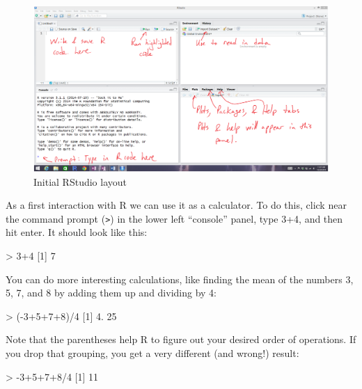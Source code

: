 \documentclass[]{book}
\newenvironment{Shaded}{\begin{snugshade}}{\end{snugshade}}
\newcommand{\DecValTok}[1]{\textcolor[rgb]{0.00,0.00,0.81}{{#1}}}
\newcommand{\StringTok}[1]{\textcolor[rgb]{0.31,0.60,0.02}{{#1}}}
\newcommand{\NormalTok}[1]{{#1}}
\begin{document}
\begin{figure}
\includegraphics[width=14.72in]{chapter0_files/image003} \caption{Initial RStudio layout}\label{fig:Figure2}
\end{figure}

As a first interaction with R we can use it as a calculator. To do this,
click near the command prompt (\texttt{\textgreater{}}) in the lower
left ``console'' panel, type 3+4, and then hit enter. It should look
like this:

\begin{Shaded}
\begin{Highlighting}[]
\NormalTok{>}\StringTok{ }\DecValTok{3+4}
\NormalTok{[}\DecValTok{1}\NormalTok{] }\DecValTok{7}
\end{Highlighting}
\end{Shaded}

You can do more interesting calculations, like finding the mean of the
numbers 3, 5, 7, and 8 by adding them up and dividing by 4:

\begin{Shaded}
\begin{Highlighting}[]
\NormalTok{>}\StringTok{ }\NormalTok{(-}\DecValTok{3+5+7+8}\NormalTok{)/}\DecValTok{4}
\NormalTok{[}\DecValTok{1}\NormalTok{] }\DecValTok{4}\NormalTok{. }\DecValTok{25}
\end{Highlighting}
\end{Shaded}

Note that the parentheses help R to figure out your desired order of
operations. If you drop that grouping, you get a very different (and
wrong!) result:

\begin{Shaded}
\begin{Highlighting}[]
\NormalTok{>}\StringTok{ }\NormalTok{-}\DecValTok{3+5+7+8}\NormalTok{/}\DecValTok{4}
\NormalTok{[}\DecValTok{1}\NormalTok{] }\DecValTok{11}
\end{Highlighting}
\end{Shaded}
\end{document}
